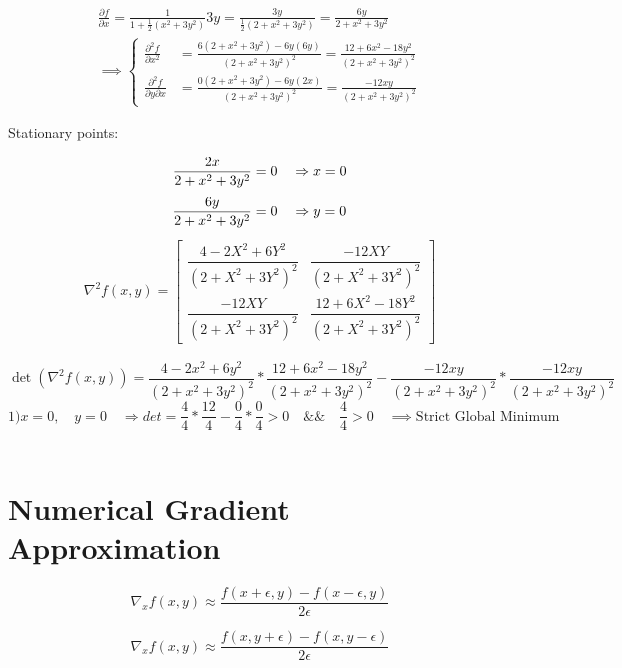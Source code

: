 \documentclass[12pt]{article}         %
\begin{document}
$$
\begin{aligned}
\frac {\partial f}{\partial x} = \frac{1}{1+\frac{1}{2}(x^2+3y^2)}3y= \frac{3y}{\frac{1}{2}(2+x^2+3y^2)}=\frac{6y}{2+x^2+3y^2}\\
\implies 
	\left\{
	\begin{aligned}
		\frac {\partial^2 f}{\partial x^2}&=\frac{6(2+x^2+3y^2)-6y(6y)}{(2+x^2+3y^2)^2}=
		 	\frac{12+6x^2-18y^2}{(2+x^2+3y^2)^2} \\
		\frac {\partial^2 f}{\partial y \partial x}&=\frac{0(2+x^2+3y^2)-6y(2x)}{(2+x^2+3y^2)^2}=
		 	\frac{-12xy}{(2+x^2+3y^2)^2} 
	 \end{aligned} 
	 \right.
\end{aligned}
$$

Stationary points:

$$
\frac{2x}{2+x^2+3y^2}=0 \quad\Rightarrow x=0\\
$$
$$
\frac{6y}{2+x^2+3y^2}=0 \quad\Rightarrow y=0\\
$$
\begin{gather}
\nabla^2 f(x,y) = 
  \begin{bmatrix}
   \dfrac{4 - 2X^2 +6Y^2}{(2 + X^2 + 3Y^2)^2} &
   \dfrac{-12XY}{(2 + X^2 + 3Y^2)^2}\\
   \dfrac{-12XY}{(2 + X^2 + 3Y^2)^2} &
   \dfrac{12 + 6X^2 - 18Y^2}{(2 + X^2 + 3Y^2)^2} 
   \end{bmatrix}
    \nonumber
\end{gather}

$$
\det\left(\nabla^2 f(x,y)\right)=\frac{4-2x^2+6y^2}{(2+x^2+3y^2)^2} * \frac{12+6x^2-18y^2}{(2+x^2+3y^2)^2} - \frac{-12xy}{(2+x^2+3y^2)^2} *  \frac{-12xy}{(2+x^2+3y^2)^2}
$$
$$
1) x=0, \quad y=0 \quad\Rightarrow det=\frac{4}{4}*\frac{12}{4}-\frac{0}{4}*\frac{0}{4} > 0  \quad \&\& \quad \frac{4}{4} > 0 \quad\implies \text{Strict Global Minimum}
$$\\


\section{Numerical Gradient Approximation}


\begin{equation}
	\nabla_x f(x,y) \approx \dfrac{f(x + \epsilon, y) - f(x - \epsilon, y)}{2\epsilon}
\end{equation}

\begin{equation}
	\nabla_x f(x,y) \approx \dfrac{f(x, y + \epsilon) - f(x, y - \epsilon)}{2\epsilon}
\end{equation}
\end{document}
